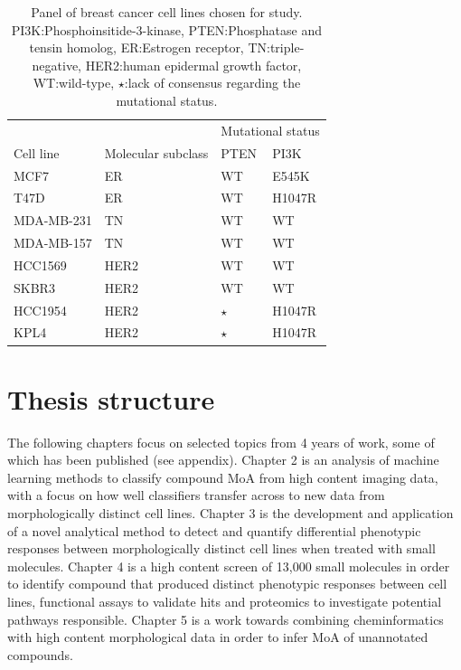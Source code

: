 \documentclass[a4paper,11pt,twoside,openright]{scrbook}
\begin{document}
\begin{table}[]
    \begin{footnotesize}
    \captionsetup{width=0.8\linewidth}
    \centering
    \caption[Panel of breast cancer cell lines chosen for study]{Panel of breast cancer cell lines chosen for study. PI3K:Phosphoinsitide-3-kinase, PTEN:Phosphatase and tensin homolog, ER:Estrogen receptor, TN:triple-negative, HER2:human epidermal growth factor, WT:wild-type, $\star$:lack of consensus regarding the mutational status.}
    \label{table:cell-lines}
    \begin{tabular}{@{}llll@{}}
    \toprule
               &                    & \multicolumn{2}{l}{Mutational status} \\
    Cell line  & Molecular subclass & PTEN             & PI3K               \\ \midrule
    MCF7       & ER                 & WT               & E545K              \\
    T47D       & ER                 & WT               & H1047R             \\
    MDA-MB-231 & TN                 & WT               & WT                 \\
    MDA-MB-157 & TN                 & WT               & WT                 \\
    HCC1569    & HER2               & WT               & WT                 \\
    SKBR3      & HER2               & WT               & WT                 \\
    HCC1954    & HER2               & $\star$          & H1047R             \\
    KPL4       & HER2               & $\star$          & H1047R             \\ \bottomrule
    \end{tabular}
    \end{footnotesize}
\end{table}

\section{Thesis structure}
The following chapters focus on selected topics from 4 years of work, some of which has been published (see appendix).
Chapter 2 is an analysis of machine learning methods to classify compound MoA from high content imaging data, with a focus on how well classifiers transfer across to new data from morphologically distinct cell lines.
Chapter 3 is the development and application of a novel analytical method to detect and quantify differential phenotypic responses between morphologically distinct cell lines when treated with small molecules.
Chapter 4 is a high content screen of 13,000 small molecules in order to identify compound that produced distinct phenotypic responses between cell lines, functional assays to validate hits and proteomics to investigate potential pathways responsible.
Chapter 5 is a work towards combining cheminformatics with high content morphological data in order to infer MoA of unannotated compounds.


\end{document}

